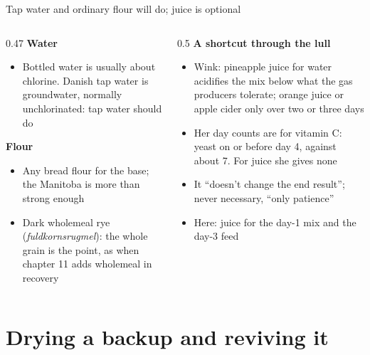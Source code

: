 \documentclass[aspectratio=169,11pt]{beamer}
\begin{document}
\begin{frame}{Tap water and ordinary flour will do; juice is optional}
  \begin{columns}[T]
    \begin{column}{0.47\textwidth}
      \small
      \textbf{\color{crust}Water}
      \begin{itemize}
        \item Bottled water is usually about chlorine. Danish tap water is groundwater, normally unchlorinated: tap water should do
      \end{itemize}
      \textbf{\color{crust}Flour}
      \begin{itemize}
        \item Any bread flour for the base; the Manitoba is more than strong enough
        \item Dark wholemeal rye (\textit{fuldkornsrugmel}): the whole grain is the point, as when chapter 11 adds wholemeal in recovery
      \end{itemize}
    \end{column}
    \begin{column}{0.5\textwidth}
      \small
      \textbf{\color{crust}A shortcut through the lull}
      \begin{itemize}
        \item Wink: pineapple juice for water acidifies the mix below what the gas producers tolerate; orange juice or apple cider only over two or three days
        \item Her day counts are for vitamin C: yeast on or before day 4, against about 7. For juice she gives none
        \item It ``doesn't change the end result''; never necessary, ``only patience''
        \item Here: juice for the day-1 mix and the day-3 feed \untested
      \end{itemize}
    \end{column}
  \end{columns}
\end{frame}

\section{Drying a backup and reviving it}
\end{document}
